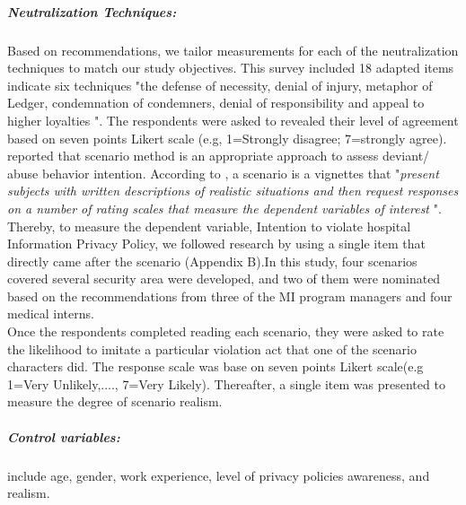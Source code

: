 \subparagraph{Neutralization Techniques:} Based on \cite{Siponen2010} recommendations, we tailor measurements for each of the neutralization techniques to match our study objectives. This survey included 18 adapted items indicate six techniques "the defense of necessity, denial of injury, metaphor of Ledger, condemnation of condemners, denial of responsibility and appeal to higher loyalties ". The respondents were asked to revealed their level of agreement based on seven points Likert scale (e.g, 1=Strongly disagree; 7=strongly agree). \\
\cite{Siponen2010} reported that scenario method is an appropriate approach to assess deviant/ abuse behavior intention. According to \citet{trevino1992experimental} , a scenario is a vignettes that "\textit{present subjects with written descriptions of realistic situations and then request responses on a number of rating scales that measure the dependent variables of interest} ". Thereby, to measure the dependent variable, Intention to violate hospital Information Privacy Policy, we followed \cite{Siponen2010,Teh2015} research by using a single item that  directly came after the scenario (Appendix B).In this study, four scenarios covered several security area were developed, and two of them were nominated based on the recommendations from three of the MI program managers and four medical interns.\\
Once the respondents completed reading each scenario, they were asked to rate the likelihood to imitate a particular violation act that one of the scenario characters did. The response scale was base on seven points Likert scale(e.g 1=Very Unlikely,...., 7=Very Likely). Thereafter, a single item was presented to measure the degree of scenario realism. 
\subparagraph {Control variables: } include age, gender, work experience, level of privacy policies awareness, and realism.
 

